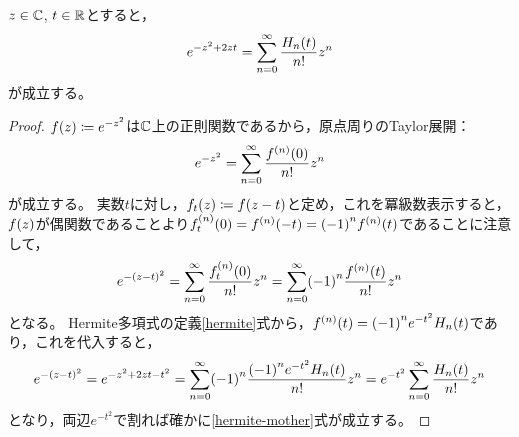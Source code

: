 \documentclass[a4paper,draft]{ltjsarticle}
\begin{document}
\begin{prop}[Hermite多項式の母関数]\label{mother}
    $z\in\mathbb{C}$, $t\in\mathbb{R}$とすると，
    \begin{equation}
        \label{hermite-mother}
        e^{-z^2+2zt}=\sum_{n=0}^\infty \dfrac{\fun{H_n}{t}}{n!}z^n
    \end{equation}
    が成立する。

    \begin{proof}
        $\fun{f}{z}\coloneqq e^{-z^2}$は$\mathbb{C}$上の正則関数であるから，原点周りのTaylor展開：
        \begin{equation}
            e^{-z^2}=\sum_{n=0}^\infty \dfrac{\fun{f^{\pare{n}}}{0}}{n!}z^n
        \end{equation}
        が成立する。
        実数$t$に対し，$\fun{f_t}{z}\coloneqq \fun{f}{z-t}$と定め，これを冪級数表示すると，$\fun{f}{z}$が偶関数であることより$\fun{f_t^{\pare{n}}}{0}=\fun{f^{\pare{n}}}{-t}=\pare{-1}^n\fun{f^{\pare{n}}}{t}$であることに注意して，
        \begin{equation}
            e^{-\pare{z-t}^2}=\sum_{n=0}^\infty \dfrac{\fun{f_t^{\pare{n}}}{0}}{n!}z^n=\sum_{n=0}^\infty \pare{-1}^n \dfrac{\fun{f^{\pare{n}}}{t}}{n!}z^n
        \end{equation}
        となる。
        Hermite多項式の定義\eqref{hermite}式から，$\fun{f^{\pare{n}}}{t}=\pare{-1}^ne^{-t^2}\fun{H_n}{t}$であり，これを代入すると，
        \begin{equation}
            e^{-\pare{z-t}^2}=e^{-z^2+2zt-t^2}=\sum_{n=0}^\infty \pare{-1}^n\dfrac{\pare{-1}^ne^{-t^2}\fun{H_n}{t}}{n!}z^n
            =e^{-t^2}\sum_{n=0}^\infty \dfrac{\fun{H_n}{t}}{n!}z^n
        \end{equation}
        となり，両辺$e^{-t^2}$で割れば確かに\eqref{hermite-mother}式が成立する。
    \end{proof}
\end{prop}
\end{document}
